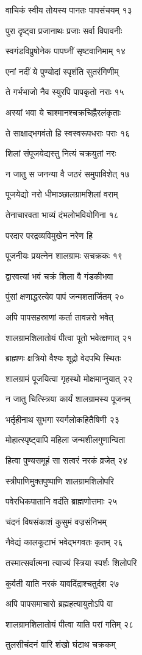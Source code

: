 वाचिकं स्वीय तोयस्य पानतः पापसंचयम् १३

पुरा दृष्ट्वा प्रजानाथः प्रजाः सर्वा विपावनीः

स्वगंडविप्रुषोनेक पापघ्नीं सृष्टवानिमाम् १४

एनां नदीं ये पुण्योदां स्पृशंति सुतरंगिणीम्

ते गर्भभाजो नैव स्युरपि पापकृतो नराः १५

अस्यां भवा ये चाश्मानश्चक्रचिह्नैरलंकृताः

ते साक्षाद्भगवंतो हि स्वस्वरूपधराः पराः १६

शिलां संपूजयेद्यस्तु नित्यं चक्रयुतां नरः

न जातु स जनन्या वै जठरं समुपाविशेत् १७

पूजयेद्यो नरो धीमाञ्छालग्रामशिलां वराम्

तेनाचारवता भाव्यं दंभलोभवियोगिना १८

परदार परद्रव्यविमुखेन नरेण हि

पूजनीयः प्रयत्नेन शालग्रामः सचक्रकः १९

द्वारवत्यां भवं चक्रं शिला वै गंडकीभवा

पुंसां क्षणाद्धरत्येव पापं जन्मशतार्जितम् २०

अपि पापसहस्राणां कर्ता तावन्नरो भवेत्

शालग्रामशिलातोयं पीत्वा पूतो भवेत्क्षणात् २१

ब्राह्मणः क्षत्रियो वैश्यः शूद्रो वेदपथि स्थितः

शालग्रामं पूजयित्वा गृहस्थो मोक्षमाप्नुयात् २२

न जातु चित्स्त्रिया कार्यं शालग्रामस्य पूजनम्

भर्तृहीनाथ सुभगा स्वर्गलोकहितैषिणी २३

मोहात्स्पृष्ट्वापि महिला जन्मशीलगुणान्विता

हित्वा पुण्यसमूहं सा सत्वरं नरकं व्रजेत् २४

स्त्रीपाणिमुक्तपुष्पाणि शालग्रामशिलोपरि

पवेरधिकपातानि वदंति ब्राह्मणोत्तमाः २५

चंदनं विषसंकाशं कुसुमं वज्रसंनिभम्

नैवेद्यं कालकूटाभं भवेद्भगवतः कृतम् २६

तस्मात्सर्वात्मना त्याज्यं स्त्रिया स्पर्शः शिलोपरि

कुर्वती याति नरकं यावदिंद्राश्चतुर्दश २७

अपि पापसमाचारो ब्रह्महत्यायुतोऽपि वा

शालग्रामशिलातोयं पीत्वा याति परां गतिम् २८

तुलसीचंदनं वारि शंखो घंटाथ चक्रकम्

